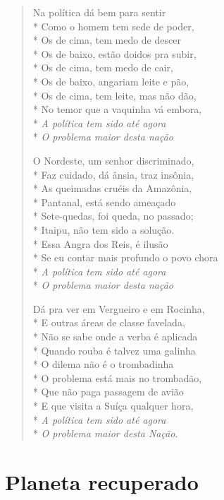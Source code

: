 \begin{verse}
Na política dá bem para sentir\\*
Como o homem tem sede de poder,\\*
Os de cima, tem medo de descer\\*
Os de baixo, estão doidos pra subir,\\*
Os de cima, tem medo de cair,\\*
Os de baixo, angariam leite e pão,\\*
Os de cima, tem leite, mas não dão,\\*
No temor que a vaquinha vá embora,\\*
\textit{A política tem sido até agora}\\*
\textit{O problema maior desta nação}

O Nordeste, um senhor discriminado,\\*
Faz cuidado, dá ânsia, traz insônia,\\*
As queimadas cruéis da Amazônia,\\*
Pantanal, está sendo ameaçado\\*
Sete-quedas, foi queda, no passado;\\*
Itaipu, não tem sido a solução.\\*
Essa Angra dos Reis, é ilusão\\*
Se eu contar mais profundo o povo chora\\*
\textit{A política tem sido até agora}\\*
\textit{O problema maior desta nação}

Dá pra ver em Vergueiro e em Rocinha,\\*
E outras áreas de classe favelada,\\*
Não se sabe onde a verba é aplicada\\*
Quando rouba é talvez uma galinha\\*
O dilema não é o trombadinha\\*
O problema está mais no trombadão,\\*
Que não paga passagem de avião\\*
E que visita a Suíça qualquer hora,\\*
\textit{A política tem sido até agora}\\*
\textit{O problema maior desta Nação}.
\end{verse}


\chapter{Planeta recuperado}

